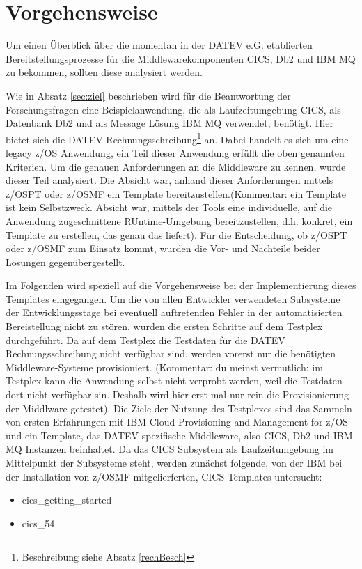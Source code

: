 \chapter{Vorgehensweise}\label{ch:vorgehensweise}
Um einen Überblick über die momentan in der DATEV e.G. etablierten Bereitstellungsprozesse für die Middlewarekomponenten CICS, Db2 und IBM MQ zu bekommen, sollten diese analysiert werden.

Wie in Absatz \ref{sec:ziel} beschrieben wird für die Beantwortung der Forschungsfragen eine Beispielanwendung, die als Laufzeitumgebung CICS, als Datenbank Db2 und als Message Lösung IBM MQ verwendet, benötigt.
Hier bietet sich die \glqq DATEV Rechnungsschreibung\grqq{}\footnote{Beschreibung siehe Absatz \ref{rechBesch}} an.
Dabei handelt es sich um eine legacy z/OS Anwendung, ein Teil dieser Anwendung erfüllt die oben genannten Kriterien.
Um die genauen Anforderungen an die Middleware zu kennen, wurde dieser Teil analysiert.
Die Absicht war, anhand dieser Anforderungen mittels z/OSPT oder z/OSMF ein Template bereitzustellen.(Kommentar: ein Template ist kein Selbstzweck. Absicht war, mittels der Tools eine individuelle, auf die Anwendung zugeschnittene RUntime-Umgebung bereitzustellen, d.h. konkret, ein Template zu erstellen, das genau das liefert).
Für die Entscheidung, ob z/OSPT oder z/OSMF zum Einsatz kommt, wurden die Vor- und Nachteile beider Lösungen gegenübergestellt.

Im Folgenden wird speziell auf die Vorgehensweise bei der Implementierung dieses Templates eingegangen.
Um die von allen Entwickler verwendeten Subsysteme der Entwicklungsstage bei eventuell auftretenden Fehler in der automatisierten Bereistellung nicht zu stören, wurden die ersten Schritte auf dem Testplex durchgeführt.
Da auf dem Testplex die Testdaten für die DATEV Rechnungsschreibung nicht verfügbar sind, werden vorerst nur die benötigten Middleware-Systeme provisioniert. (Kommentar: du meinst vermutlich: im Testplex kann die Anwendung selbst nicht verprobt werden, weil die Testdaten dort nicht verfügbar sin. Deshalb wird hier erst mal nur rein die Provisionierung der Middlware getestet).
Die Ziele der Nutzung des Testplexes sind das Sammeln von ersten Erfahrungen mit \glqq IBM Cloud Provisioning and Management for z/OS\grqq{} und ein Template, das DATEV spezifische Middleware, also CICS, Db2 und IBM MQ Instanzen beinhaltet.
Da das CICS Subsystem als Laufzeitumgebung im Mittelpunkt der Subsysteme steht, werden zunächst folgende, von der IBM bei der Installation von z/OSMF mitgelierferten, CICS Templates untersucht:
\begin{itemize}
\item \glqq cics\_getting\_started\grqq
\item \glqq cics\_54\grqq
\end{itemize}

